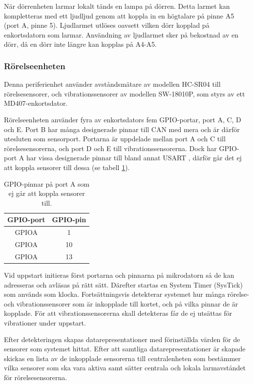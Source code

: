 \documentclass{article}
\begin{document}
När dörrenheten larmar lokalt tänds en lampa på dörren. Detta larmet kan kompletteras med ett  ljudljud
genom att koppla in en högtalare på pinne A5 (port A, pinne 5). Ljudlarmet utlöses oavsett vilken dörr kopplad på enkortsdatorn som larmar. Användning av ljudlarmet sker på bekostnad av en dörr, då en dörr inte längre kan kopplas på A4-A5.


\subsubsection{Rörelseenheten}
Denna periferienhet använder avståndsmätare av modellen HC-SR04\cite{HC-SR04} till rörelsesensorer,
 och vibrationssensorer av modellen SW-18010P\cite{SW-18010P}, som styrs av ett MD407-enkortsdator.

Rörelseenheten använder fyra av enkortsdators fem GPIO-portar, port A, C, D och E.
Port B har många designerade pinnar till CAN med mera och är därför utesluten som
sensorport. Portarna är uppdelade mellan port A och C till rörelsesensorerna,
och port D och E till vibrationssensorerna. Dock har GPIO-port A har vissa designerade pinnar
till bland annat USART , därför går det ej att koppla sensorer till dessa (se tabell \ref{tab:Ogiltliga pinnar}).

\begin{table}[htbp]
	\centering
	\begin{tabular}{|c|c|} \hline
		GPIO-port & GPIO-pin \\ \hline \hline
		GPIOA & 1 \\ \hline
		GPIOA & 10 \\ \hline
		GPIOA & 13 \\ \hline
	\end{tabular}
	\caption{GPIO-pinnar på port A som ej går att koppla sensorer till.}
	\label{tab:Ogiltliga pinnar}
\end{table}

Vid uppstart initieras först portarna och pinnarna på mikrodatorn så de kan adresseras och avläsas på rätt sätt. Därefter startas en System Timer (SysTick) som används som klocka.
Fortsättningsvis detekterar systemet hur många rörelse- och vibrationssensorer som är inkopplade till kortet, och på vilka pinnar de är kopplade. För att vibrationssensorerna skall detekteras får de ej utsättas för vibrationer under uppstart.

Efter detekteringen skapas datarepresentationer med förinställda värden för de
sensorer som systemet hittat. Efter att samtliga datarepresentationer är skapade skickas
en lista av de inkopplade sensorerna till centralenheten som bestämmer vilka sensorer som ska vara aktiva
samt sätter centrala och lokala larmavståndet för rörelsesensorerna.
\end{document}
